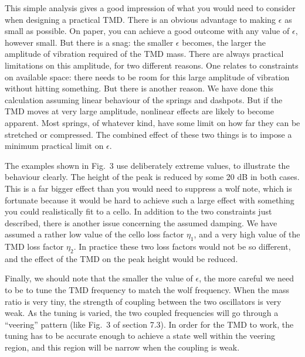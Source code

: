   This simple analysis gives a good impression of what you would need to 
  consider when designing a practical TMD. There is an obvious advantage to 
  making $\epsilon$ as small as possible. On paper, you can achieve a good 
  outcome with any value of $\epsilon$, however small. But there is a snag: the 
  smaller $\epsilon$ becomes, the larger the amplitude of vibration required of 
  the TMD mass. There are always practical limitations on this amplitude, for 
  two different reasons. One relates to constraints on available space: there 
  needs to be room for this large amplitude of vibration without hitting 
  something. But there is another reason. We have done this calculation 
  assuming linear behaviour of the springs and dashpots. But if the TMD moves 
  at very large amplitude, nonlinear effects are likely to become apparent. 
  Most springs, of whatever kind, have some limit on how far they can be 
  stretched or compressed. The combined effect of these two things is to impose 
  a minimum practical limit on $\epsilon$. 

  The examples shown in Fig.\ 3 use deliberately extreme values, to illustrate 
  the behaviour clearly. The height of the peak is reduced by some 20 dB in 
  both cases. This is a far bigger effect than you would need to suppress a 
  wolf note, which is fortunate because it would be hard to achieve such a 
  large effect with something you could realistically fit to a cello. In 
  addition to the two constraints just described, there is another issue 
  concerning the assumed damping. We have assumed a rather low value of the 
  cello loss factor $\eta_1$, and a very high value of the TMD loss factor 
  $\eta_2$. In practice these two loss factors would not be so different, and 
  the effect of the TMD on the peak height would be reduced. 

  Finally, we should note that the smaller the value of $\epsilon$, the more 
  careful we need to be to tune the TMD frequency to match the wolf frequency. 
  When the mass ratio is very tiny, the strength of coupling between the two 
  oscillators is very weak. As the tuning is varied, the two coupled 
  frequencies will go through a ``veering'' pattern (like Fig.\ 3 of section 
  7.3). In order for the TMD to work, the tuning has to be accurate enough to 
  achieve a state well within the veering region, and this region will be 
  narrow when the coupling is weak. 